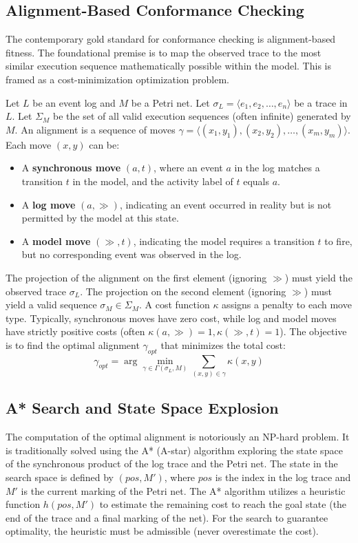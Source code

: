\subsection{Alignment-Based Conformance Checking}
The contemporary gold standard for conformance checking is alignment-based fitness. The foundational premise is to map the observed trace to the most similar execution sequence mathematically possible within the model. This is framed as a cost-minimization optimization problem.

Let $L$ be an event log and $M$ be a Petri net. Let $\sigma_L = \langle e_1, e_2, \dots, e_n \rangle$ be a trace in $L$. Let $\Sigma_M$ be the set of all valid execution sequences (often infinite) generated by $M$.
An alignment is a sequence of moves $\gamma = \langle (x_1, y_1), (x_2, y_2), \dots, (x_m, y_m) \rangle$. Each move $(x, y)$ can be:
\begin{itemize}
    \item A \textbf{synchronous move} $(a, t)$, where an event $a$ in the log matches a transition $t$ in the model, and the activity label of $t$ equals $a$.
    \item A \textbf{log move} $(a, \gg)$, indicating an event occurred in reality but is not permitted by the model at this state.
    \item A \textbf{model move} $(\gg, t)$, indicating the model requires a transition $t$ to fire, but no corresponding event was observed in the log.
\end{itemize}

The projection of the alignment on the first element (ignoring $\gg$) must yield the observed trace $\sigma_L$. The projection on the second element (ignoring $\gg$) must yield a valid sequence $\sigma_M \in \Sigma_M$.
A cost function $\kappa$ assigns a penalty to each move type. Typically, synchronous moves have zero cost, while log and model moves have strictly positive costs (often $\kappa(a, \gg) = 1, \kappa(\gg, t) = 1$).
The objective is to find the optimal alignment $\gamma_{opt}$ that minimizes the total cost:
\begin{equation}
\gamma_{opt} = \arg\min_{\gamma \in \Gamma(\sigma_L, M)} \sum_{(x,y) \in \gamma} \kappa(x,y)
\end{equation}

\subsection{A* Search and State Space Explosion}
The computation of the optimal alignment is notoriously an NP-hard problem. It is traditionally solved using the A* (A-star) algorithm exploring the state space of the synchronous product of the log trace and the Petri net. The state in the search space is defined by $(pos, M')$, where $pos$ is the index in the log trace and $M'$ is the current marking of the Petri net. The A* algorithm utilizes a heuristic function $h(pos, M')$ to estimate the remaining cost to reach the goal state (the end of the trace and a final marking of the net). For the search to guarantee optimality, the heuristic must be admissible (never overestimate the cost).

